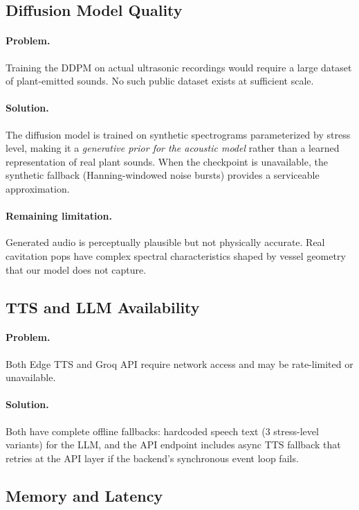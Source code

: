 \documentclass[11pt,a4paper,twocolumn]{article}
\begin{document}
\subsection{Diffusion Model Quality}

\paragraph{Problem.} Training the DDPM on actual ultrasonic recordings would require a large dataset of plant-emitted sounds. No such public dataset exists at sufficient scale.

\paragraph{Solution.} The diffusion model is trained on synthetic spectrograms parameterized by stress level, making it a \emph{generative prior for the acoustic model} rather than a learned representation of real plant sounds. When the checkpoint is unavailable, the synthetic fallback (Hanning-windowed noise bursts) provides a serviceable approximation.

\paragraph{Remaining limitation.} Generated audio is perceptually plausible but not physically accurate. Real cavitation pops have complex spectral characteristics shaped by vessel geometry that our model does not capture.

\subsection{TTS and LLM Availability}

\paragraph{Problem.} Both Edge TTS and Groq API require network access and may be rate-limited or unavailable.

\paragraph{Solution.} Both have complete offline fallbacks: hardcoded speech text (3 stress-level variants) for the LLM, and the API endpoint includes async TTS fallback that retries at the API layer if the backend's synchronous event loop fails.

\subsection{Memory and Latency}
\end{document}
